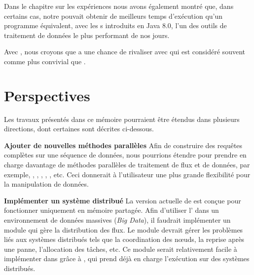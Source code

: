 \begin{conclusion}
Dans le chapitre sur les exp\'eriences nous avons \'egalement montr\'e que, dans certains cas, notre  pouvait obtenir de meilleurs temps d'ex\'ecution qu'un programme  \'equivalent, avec les s introduits en Java 8.0, l'un des outils de traitement de donn\'ees le plus performant de nos jours.

Avec , nous croyons que  a une chance de rivaliser avec  qui est consid\'er\'e souvent comme plus convivial que . 


\section*{\textbf{Perspectives}}

Les travaux pr\'esent\'es dans ce m\'emoire pourraient \^etre \'etendus dans plusieurs directions, dont certaines sont d\'ecrites ci-dessous.

\textbf{Ajouter de nouvelles m\'ethodes parall\`eles} Afin de construire des requ\^etes compl\`etes sur une s\'equence de donn\'ees, nous pourrions \'etendre  pour prendre en charge davantage de m\'ethodes parall\`eles de traitement de flux et de donn\'ees, par exemple, , , , , , etc. Ceci donnerait \`a l'utilisateur une plus grande flexibilit\'e pour la manipulation de donn\'ees.

\textbf{Impl\'ementer un syst\`eme distribu\'e} La version actuelle de  est con\c{c}ue pour fonctionner uniquement en m\'emoire partag\'ee. Afin d'utiliser l' dans un environnement de donn\'ees massives (\emph{Big Data}), il faudrait impl\'ementer un module qui g\`ere la distribution des flux. Le module devrait g\'erer les probl\`emes li\'es aux syst\`emes distribu\'es tels que la coordination des nœuds, la reprise apr\`es une panne, l'allocation des t\^aches, etc. Ce module serait relativement facile \`a impl\'ementer dans  gr\^ace \`a , qui prend d\'ej\`a en charge l'ex\'ecution sur des syst\`emes distribu\'es.


\end{conclusion}




